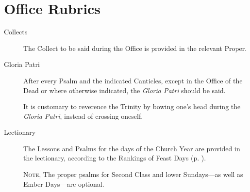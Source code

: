 \section{Office Rubrics}
\begin{description}
\item[Collects] The Collect to be said during the Office is provided in the relevant Proper.
\item[Gloria Patri] After every Psalm and the indicated Canticles, except in the Office of the Dead or where otherwise indicated, the \emph{Gloria Patri} should be said.\par
It is customary to reverence the Trinity by bowing one's head during the \emph{Gloria Patri}, instead of crossing oneself.
\item[Lectionary] The Lessons and Psalms for the days of the Church Year are provided in the lectionary, according to the Rankings of Feast Days (p. \pageref{ranking}).\par
\textsc{Note,} The proper psalms for Second Class and lower Sundays---as well as Ember Days---are optional.


\end{description}

